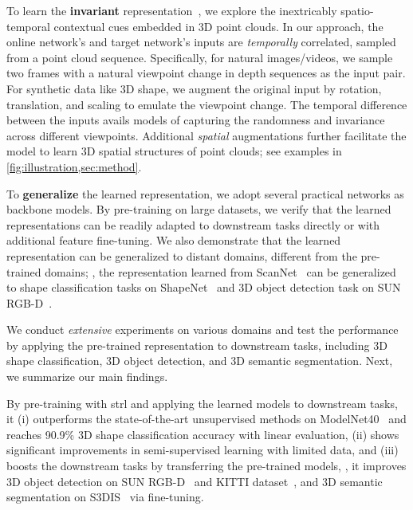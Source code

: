 \documentclass[10pt,twocolumn,letterpaper]{article}
\makeatletter
\renewcommand{\paragraph}{\@startsection{paragraph}{4}{\z@}{0ex \@plus 0ex \@minus 0ex}{-1em}{\hskip\parindent\normalfont\normalsize\bfseries}}
\makeatother
\begin{document}
To learn the \textbf{invariant} representation~\cite{foldiak1991learning,wiskott2002slow}, we explore the inextricably spatio-temporal contextual cues embedded in 3D point clouds. In our approach, the online network's and target network's inputs are \emph{temporally} correlated, sampled from a point cloud sequence. Specifically, for natural images/videos, we sample two frames with a natural viewpoint change in depth sequences as the input pair. For synthetic data like 3D shape, we augment the original input by rotation, translation, and scaling to emulate the viewpoint change. The temporal difference between the inputs avails models of capturing the randomness and invariance across different viewpoints. Additional \emph{spatial} augmentations further facilitate the model to learn 3D spatial structures of point clouds; see examples in \cref{fig:illustration,sec:method}.

To \textbf{generalize} the learned representation, we adopt several practical networks as backbone models. By pre-training on large datasets, we verify that the learned representations can be readily adapted to downstream tasks directly or with additional feature fine-tuning. We also demonstrate that the learned representation can be generalized to distant domains, different from the pre-trained domains; \eg, the representation learned from ScanNet~\cite{dai2017scannet} can be generalized to shape classification tasks on ShapeNet~\cite{chang2015shapenet} and 3D object detection task on SUN RGB-D~\cite{song2015sun}.

We conduct \emph{extensive} experiments on various domains and test the performance by applying the pre-trained representation to downstream tasks, including 3D shape classification, 3D object detection, and 3D semantic segmentation. Next, we summarize our main findings.

\paragraph{Our method outperforms prior arts.}

By pre-training with \ac{strl} and applying the learned models to downstream tasks, it (i) outperforms the state-of-the-art unsupervised methods on ModelNet40~\cite{wu20153d} and reaches 90.9\% 3D shape classification accuracy with linear evaluation, (ii) shows significant improvements in semi-supervised learning with limited data, and (iii) boosts the downstream tasks by transferring the pre-trained models, \eg, it improves 3D object detection on SUN RGB-D~\cite{song2015sun} and KITTI dataset~\cite{geiger2012we}, and 3D semantic segmentation on S3DIS~\cite{armeni20163d} via fine-tuning.
\end{document}
